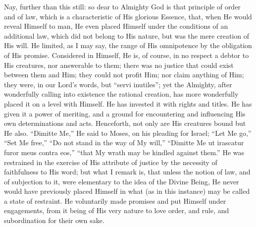 Nay, further than this still: so dear to Almighty God
is that principle of order and of law, which is a
characteristic of His glorious Essence, that, when He
would reveal Himself to man, He even placed Himself under
the conditions of an additional law, which did not belong
to His nature, but was the mere creation of His will. He
limited, as I may say, the range of His omnipotence by
the obligation of His promise. Considered in Himself, He
is, of course, in no respect a debtor to His creatures,
nor answerable to them; there was no justice that could
exist between them and Him; they could not profit Him;
nor claim anything of Him; they were, in our Lord's
words, but ``servi inutiles''; yet the Almighty,
after wonderfully calling into existence the rational
creation, has more wonderfully placed it on a level with
Himself. He has invested it with rights and titles. He
has given it a power of meriting, and a ground for
encountering and influencing His own determinations and
acts. Henceforth, not only are His creatures bound but He
also. ``Dimitte Me,'' He said to Moses, on his
pleading for Israel; ``Let Me go,'' ``Set Me
free,'' ``Do not stand in the way of My
will,'' ``Dimitte Me ut irascatur furor meus
contra eos,'' ``that My wrath may be kindled
against them.'' He was restrained in the exercise of
His attribute of justice by the necessity of faithfulness
to His word; but what I remark is, that unless the notion
of law, and of subjection to it, were elementary to the
idea of the Divine Being, He never would have previously
placed Himself in what (as in this instance) may be
called a state of restraint. He voluntarily made promises
and put Himself under engagements, from it being of His
very nature to love order, and rule, and subordination
for their own sake.

